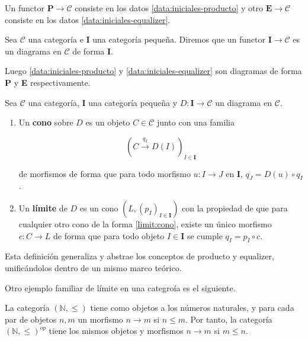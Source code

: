 Un functor $\textbf{P} \longrightarrow \mathscr{C}$ consiste en los datos \eqref{data:iniciales-producto} y otro $\textbf{E} \longrightarrow \mathscr{C}$ consiste en los datos \eqref{data:iniciales-equalizer}.

\begin{definicion} [Diagrama]
    Sea $\mathscr{C}$ una categoría e \textbf{I} una categoría pequeña. Diremos que un functor $\textbf{I} \longrightarrow \mathscr{C}$ es un diagrama en $\mathscr{C}$ de forma \textbf{I}.
\end{definicion}

Luego \eqref{data:iniciales-producto} y \eqref{data:iniciales-equalizer} son diagramas de forma \textbf{P} y \textbf{E} respectivamente.

\begin{definicion}
    Sea $\mathscr{C}$ una categoría, \textbf{I} una categoría pequeña y $D: \textbf{I} \longrightarrow \mathscr{C}$ un diagrama en $\mathscr{C}$.

    \begin{enumerate}
        \item Un \textbf{cono} sobre $D$ es un objeto $C \in \mathscr{C}$ junto con una familia
        
        \begin{equation} \label{limit:cono}
            \left( C \overset{q_I}{\longrightarrow} D(I)\right)_{I \in \textbf{I}}
        \end{equation}

        de morfismos de forma que para todo morfismo $u: I \longrightarrow J$ en \textbf{I}, $q_J = D(u) \circ q_I$.

        \item Un \textbf{límite} de $D$ es un cono $\left(L, (p_I)_{I \in \textbf{I}}\right)$ con la propiedad de que para cualquier otro cono de la forma \eqref{limit:cono}, existe un único morfismo $c: C \longrightarrow L$ de forma que para todo objeto $I \in \textbf{I}$ se cumple $q_I = p_I \circ c$.

    \end{enumerate}
\end{definicion}

Esta definición generaliza y abstrae los conceptos de producto y equalizer, unificándolos dentro de un mismo marco teórico. 

Otro ejemplo familiar de límite en una categroía es el siguiente.

\begin{observacion}
    La categoría $(\mathbb{N}, \leq)$ tiene como objetos a los números naturales, y para cada par de objetos $n,m$ un morfismo $n \longrightarrow m$ si $n \leq m$. Por tanto, la categoría $(\mathbb{N}, \leq)^{op}$ tiene los mismos objetos y morfismos $n \longrightarrow m$ si $m \leq n$.
\end{observacion}

